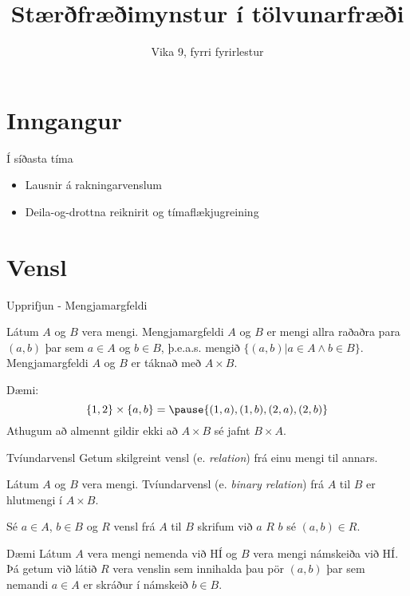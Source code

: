 \documentclass[handout]{beamer}
\title{Stærðfræðimynstur í tölvunarfræði}
\subtitle{Vika 9, fyrri fyrirlestur}
\begin{document}
\begin{frame}
\titlepage
\end{frame}


\section{Inngangur}

\begin{frame}{Í síðasta tíma}
\begin{itemize}
 \item Lausnir á rakningarvenslum
 \item Deila-og-drottna reiknirit og tímaflækjugreining
\end{itemize}
\end{frame}

\section{Vensl}

\begin{frame}{Upprifjun - Mengjamargfeldi}
\begin{tcolorbox}[title=Mengjamargfeldi]
Látum $A$ og $B$ vera mengi. Mengjamargfeldi $A$ og $B$ er mengi allra raðaðra para $(a, b)$ þar sem $a \in A$ og $b \in B$, þ.e.a.s. mengið $\{(a, b) | a \in A \land b \in B\}$. Mengjamargfeldi $A$ og $B$ er táknað með $A \times B$.
\end{tcolorbox}
Dæmi:
\[
 \{1, 2\} \times \{a, b\} = \pause \{(1, a), (1, b), (2, a), (2, b)\}
\]
Athugum að almennt gildir ekki að $A \times B$ sé jafnt $B \times A$.
\end{frame}

\begin{frame}{Tvíundarvensl}
Getum skilgreint vensl (e. \emph{relation}) frá einu mengi til annars.

\begin{tcolorbox}[title=Tvíundarvensl]
Látum $A$ og $B$ vera mengi. Tvíundarvensl (e. \emph{binary relation}) frá $A$ til $B$ er hlutmengi í $A \times B$.
\end{tcolorbox}
Sé $a \in A$, $b \in B$ og $R$ vensl frá $A$ til $B$ skrifum við $a$ $R$ $b$ sé $(a,b) \in R$.
\end{frame}

\begin{frame}{Dæmi}
Látum $A$ vera mengi nemenda við HÍ og $B$ vera mengi námskeiða við HÍ. Þá getum við látið $R$ vera venslin sem innihalda þau pör $(a,b)$ þar sem nemandi $a \in A$ er skráður í námskeið $b \in B$.
\end{frame}
\end{document}
